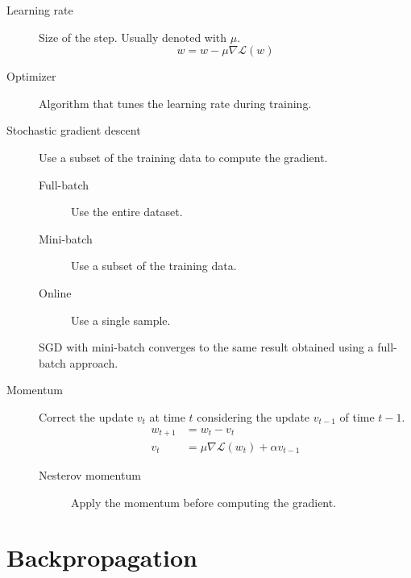 \begin{description}
    \item[Learning rate] 
        Size of the step. Usually denoted with $\mu$.
        \[ w = w - \mu \nabla \mathcal{L}(w) \]

    \item[Optimizer] 
        Algorithm that tunes the learning rate during training.

    \item[Stochastic gradient descent] 
        Use a subset of the training data to compute the gradient.
        \begin{description}
            \item[Full-batch] Use the entire dataset.
            \item[Mini-batch] Use a subset of the training data.
            \item[Online] Use a single sample.
        \end{description}

        \begin{remark}
            SGD with mini-batch converges to the same result obtained using a full-batch approach.
        \end{remark}

    \item[Momentum] 
        Correct the update $v_t$ at time $t$ considering the update $v_{t-1}$ of time $t-1$.
        \[ 
            \begin{split}
                w_{t+1} &= w_t - v_t\\
                v_t &= \mu \nabla \mathcal{L}(w_t) + \alpha v_{t-1} 
            \end{split}    
        \]

        \begin{description}
            \item[Nesterov momentum] 
                Apply the momentum before computing the gradient.
        \end{description}
\end{description}



\section{Backpropagation}

